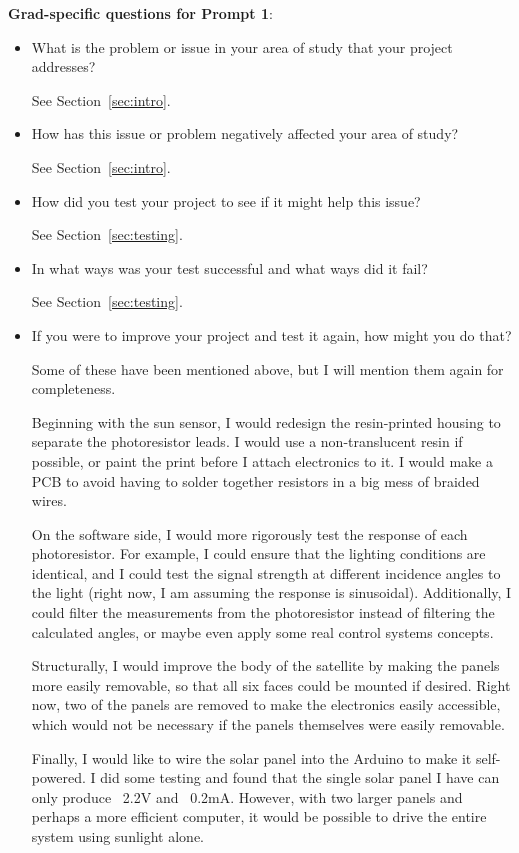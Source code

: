 \textbf{Grad-specific questions for Prompt 1}: 
\begin{itemize}[]
	\item What is the problem or issue in your area of study that your project addresses? 
	
	See Section~\ref{sec:intro}.
	
	\item How has this issue or problem negatively affected your area of study?
	
	See Section~\ref{sec:intro}.
	
	\item How did you test your project to see if it might help this issue?
	
	See Section~\ref{sec:testing}.
	
	\item In what ways was your test successful and what ways did it fail? 
	
	See Section~\ref{sec:testing}.
	
	\item If you were to improve your project and test it again, how might you do that?
	
	Some of these have been mentioned above, but I will mention them again for completeness.
	
	Beginning with the sun sensor, I would redesign the resin-printed housing to separate the photoresistor leads. I would use a non-translucent resin if possible, or paint the print before I attach electronics to it. I would make a PCB to avoid having to solder together resistors in a big mess of braided wires. 
	
	On the software side, I would more rigorously test the response of each photoresistor. For example, I could ensure that the lighting conditions are identical, and I could test the signal strength at different incidence angles to the light (right now, I am assuming the response is sinusoidal). Additionally, I could filter the measurements from the photoresistor instead of filtering the calculated angles, or maybe even apply some real control systems concepts.
	
	Structurally, I would improve the body of the satellite by making the panels more easily removable, so that all six faces could be mounted if desired. Right now, two of the panels are removed to make the electronics easily accessible, which would not be necessary if the panels themselves were easily removable. 
	
	Finally, I would like to wire the solar panel into the Arduino to make it self-powered. I did some testing and found that the single solar panel I have can only produce ~2.2V and ~0.2mA. However, with two larger panels and perhaps a more efficient computer, it would be possible to drive the entire system using sunlight alone. 
	
\end{itemize}



